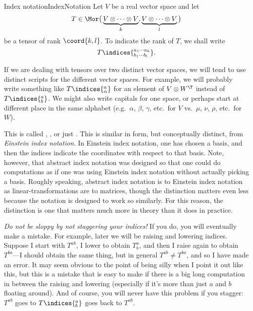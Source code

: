 \begin{ntn}{Index notation}{IndexNotation}
	Let $V$ be a real vector space and let
	\begin{equation}\label{eqn5.4.15}
	T\in \Mor \big( \underbrace{V\otimes \cdots \otimes V}_{k},\underbrace{V\otimes \cdots \otimes V}_{l}\big)
	\end{equation}
	be a tensor of rank $\coord{k,l}$.  To indicate the rank of $T$, we shall write
	\begin{equation}
		T\indices{^{a_1\cdots a_k}_{b_1\cdots b_l}}.
	\end{equation}
	\begin{rmk}
		If we are dealing with tensors over two distinct vector spaces, we will tend to use distinct scripts for the different vector spaces.  For example, we will probably write something like $T\indices{^a_{\alpha}}$ for an element of $V\otimes W^{\T}$ instead of $T\indices{^a_b}$.  We might also write capitals for one space, or perhaps start at different place in the same alphabet (e.g.~$\alpha$, $\beta$, $\gamma$, etc.~for $V$ vs.~$\mu$, $\nu$, $\rho$, etc.~for $W$).
	\end{rmk}
	\begin{rmk}
		This is called , , or just .  This is similar in form, but conceptually distinct, from \emph{Einstein index notation}.  In Einstein index notation, one has chosen a basis, and then the indices indicate the coordinates with respect to that basis.  Note, however, that abstract index notation was designed so that one could do computations as if one was using Einstein index notation without actually picking a basis.  Roughly speaking, abstract index notation is to Einstein index notation as linear-transformations are to matrices, though the distinction matters even less because the notation is designed to work so similarly.  For this reason, the distinction is one that matters much more in theory than it does in practice.
	\end{rmk}
	\begin{rmk}
		\emph{Do not be sloppy by not staggering your indices!}  If you do, you will eventually make a mistake.  For example, later we will be raising and lowering indices.  Suppose I start with $T^{ab}$, I lower to obtain $T_b^a$, and then I raise again to obtain $T^{ba}$---I should obtain the same thing, but in general $T^{ab}\neq T^{ba}$, and so I have made an error.  It may seem obvious to the point of being silly when I point it out like this, but this is a mistake that is easy to make if there is a big long computation in between the raising and lowering (especially if it's more than just $a$ and $b$ floating around).  And of course, you will never have this problem if you stagger:  $T^{ab}$ goes to $T\indices{^a_b}$ goes back to $T^{ab}$.

\end{rmk}
\end{ntn}
